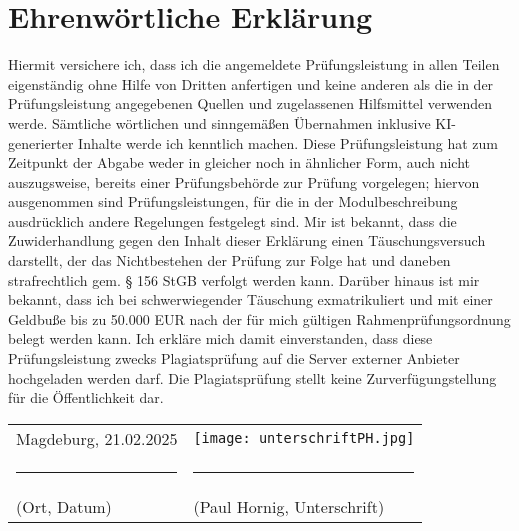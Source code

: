 \section*{Ehrenwörtliche Erklärung}

Hiermit versichere ich, dass ich die angemeldete Prüfungsleistung in allen Teilen eigenständig ohne Hilfe von Dritten anfertigen und keine anderen als die in der Prüfungsleistung angegebenen Quellen und zugelassenen Hilfsmittel verwenden werde. Sämtliche wörtlichen und sinngemäßen Übernahmen inklusive KI-generierter Inhalte werde ich kenntlich machen.
Diese Prüfungsleistung hat zum Zeitpunkt der Abgabe weder in gleicher noch in ähnlicher Form, auch nicht auszugsweise, bereits einer Prüfungsbehörde zur Prüfung vorgelegen; hiervon ausgenommen sind Prüfungsleistungen, für die in der Modulbeschreibung ausdrücklich andere Regelungen festgelegt sind.
Mir ist bekannt, dass die Zuwiderhandlung gegen den Inhalt dieser Erklärung einen Täuschungsversuch darstellt, der das Nichtbestehen der Prüfung zur Folge hat und daneben strafrechtlich gem. § 156 StGB verfolgt werden kann. Darüber hinaus ist mir bekannt, dass ich bei schwerwiegender Täuschung exmatrikuliert und mit einer Geldbuße bis zu 50.000 EUR nach der für mich gültigen Rahmenprüfungsordnung belegt werden kann.
Ich erkläre mich damit einverstanden, dass diese Prüfungsleistung zwecks Plagiatsprüfung auf die Server externer Anbieter hochgeladen werden darf. Die Plagiatsprüfung stellt keine Zurverfügungstellung für die Öffentlichkeit dar.



\vspace{1cm}




\begin{tabular}{m{7cm} m{7cm}}
    \vspace{1.3cm}Magdeburg, 21.02.2025 & \vspace{0.1cm} \texttt{[image: unterschriftPH.jpg]} \\
    \multicolumn{1}{c}{\hspace{-2cm}\rule{5cm}{0.4pt}} & \multicolumn{1}{c}{\hspace{-2cm}\rule{5cm}{0.4pt}} \\
    (Ort, Datum) & (Paul Hornig, Unterschrift) \\
\end{tabular}

